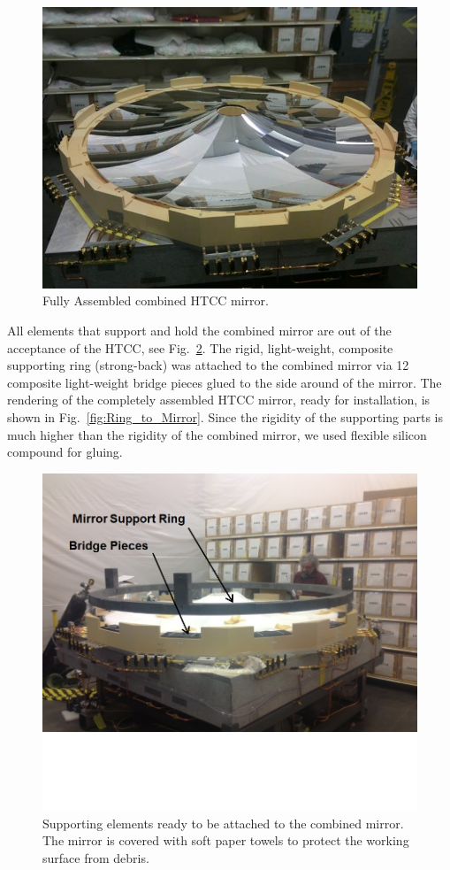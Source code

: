  \begin{figure}[ht]
    \centering
    \includegraphics[width=1.0\linewidth]{images/Compl_Assembl_MIR.jpg}
    \caption{Fully Assembled combined HTCC mirror.}
    \label{fig:Compl_Assembl_MIR}
\end{figure}
All elements that support and hold the combined mirror are out of the acceptance of the HTCC, see
Fig.~\ref{fig:Support_Ring}. The rigid, light-weight, composite supporting ring (strong-back) was attached to the
combined mirror via 12 composite light-weight bridge pieces glued to the side around of the mirror. The rendering of the completely
assembled HTCC mirror, ready for installation, is shown in Fig.~\ref{fig:Ring_to_Mirror}. Since the rigidity of the
supporting parts is much higher than the rigidity of the combined mirror, we used flexible silicon compound for
gluing.
  
\begin{figure}[ht]
    \centering
    \includegraphics[width=1.0\linewidth,trim={0 5cm 0 0},clip]{images/Support_Ring.jpg}
    \caption{Supporting elements ready to be attached to the combined mirror. The mirror is covered with soft paper
      towels to protect the working surface from debris.}
    \label{fig:Support_Ring}
\end{figure}

